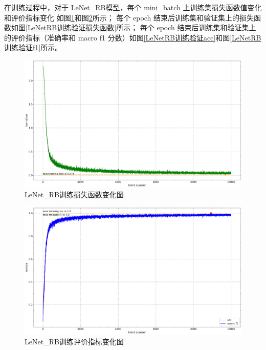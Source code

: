 \documentclass[supercite]{Experimental_Report}
\theoremstyle{definition}
\begin{document}
在训练过程中，对于 LeNet\_RB模型，每个 mini\_batch 上训练集损失函数值变化和评价指标变化
如图\ref{LeNetRB训练损失函数batch}和图\ref{LeNetRB训练评价指标batch}所示；
每个 epoch 结束后训练集和验证集上的损失函数如图\ref{LeNetRB训练验证损失函数}所示；
每个 epoch 结束后训练集和验证集上的评价指标（准确率和 macro f1 分数）如图\ref{LeNetRB训练验证acc}和图\ref{LeNetRB训练验证f1}所示。
\begin{figure}[H]
	\begin{center}
		\includegraphics[scale=0.45]{../images/LeNetRB训练损失函数batch.pdf}
		\caption{LeNet\_RB训练损失函数变化图}
		\label{LeNetRB训练损失函数batch}
	\end{center}
\end{figure}
\begin{figure}[H]
	\begin{center}
		\includegraphics[scale=0.45]{../images/LeNetRB训练评价指标batch.pdf}
		\caption{LeNet\_RB训练评价指标变化图}
		\label{LeNetRB训练评价指标batch}
	\end{center}
\end{figure}
\end{document}
